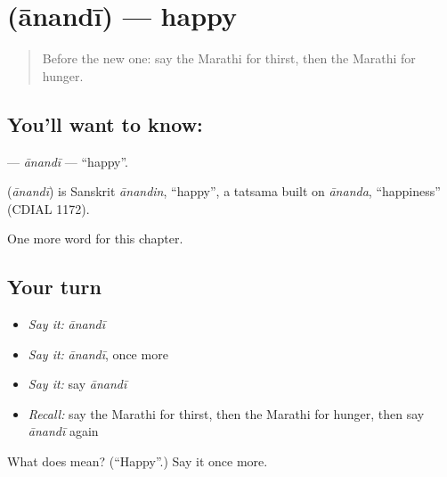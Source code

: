 \section[\texorpdfstring{\mr{आनंदी} (ānandī)}{आनंदी (ānandī)}]{ (ānandī) — happy}

\label{lesson:MR-C73-anandi}



\begin{quote}
Before the new one: say the Marathi for thirst, then the Marathi for hunger.
\end{quote}

\subsection*{You'll want to know: }
\textbf{} — \emph{ānandī} — \textquotedblleft{}happy\textquotedblright{}.

\begin{cousinweb}
\textbf{} (\emph{ānandī}) is Sanskrit \emph{ānandin}, \textquotedblleft{}happy\textquotedblright{}, a tatsama built on \emph{ānanda}, \textquotedblleft{}happiness\textquotedblright{} (CDIAL 1172).
\end{cousinweb}

\begin{grammarlens}[title={What you've built}]
One more word for this chapter.
\end{grammarlens}

\subsection*{Your turn}
\begin{itemize}
\raggedright
  \item \emph{Say it:} \emph{ānandī}
  \item \emph{Say it:} \emph{ānandī}, once more
  \item \emph{Say it:} say \emph{ānandī}
  \item \emph{Recall:} say the Marathi for thirst, then the Marathi for hunger, then say \emph{ānandī} again
\end{itemize}

\begin{tcolorbox}[breakable,colback=teal!4,colframe=teal!35!black,title={Before you move on}]
What does  mean? (\textquotedblleft{}Happy\textquotedblright{}.) Say it once more.
\end{tcolorbox}
